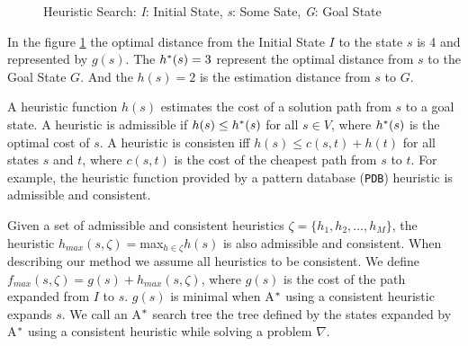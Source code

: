\begin{figure}[htb]
\centering
{}
\caption{Heuristic Search: \textit{I}: Initial State, \textit{s}: Some Sate, \textit{G}: Goal State} \label{fig:searchSpace}
\end{figure}

In the figure \ref{fig:searchSpace} the optimal distance from the Initial State $I$ to  the state $s$ is 4 and represented by $g(s)$. The $h\sp{*}(s) = 3$ represent the optimal distance from $s$ to the Goal State $G$. And the $h(s) = 2$ is the estimation distance from $s$ to $G$.

A heuristic function $h(s)$ estimates the cost of a solution path from $s$ to a goal state. A heuristic is admissible if $h(s) \leq h\sp{*}(s)$ for all $s \in V$, where $h\sp{*}(s)$ is the optimal cost of $s$. A heuristic is consisten iff $h(s) \leq c(s,t) + h(t)$ for all states $s$ and $t$, where $c(s,t)$ is the cost of the cheapest path from $s$ to $t$. For example, the heuristic function provided by a pattern database (\texttt{PDB}) heuristic \cite{culberson1998pattern} is admissible and consistent.

Given a set of admissible and consistent heuristics $\zeta = \{h_{1}, h_{2}, \dots, h_{M}\}$, the heuristic $h_{max}(s,\zeta) = $max$_{h \in \zeta} h(s)$ is also admissible and consistent. When describing our method we assume all heuristics to be consistent. We define $f_{max}(s, \zeta) = g(s) + h_{max}(s, \zeta)$, where $g(s)$ is the cost of the path expanded from $I$ to $s$. $g(s)$ is minimal when A$\sp{*}$ using a consistent heuristic expands $s$. We call an A$\sp{*}$ search tree the tree defined by the states expanded by A$\sp{*}$ using a consistent heuristic while solving a problem $\nabla$.

